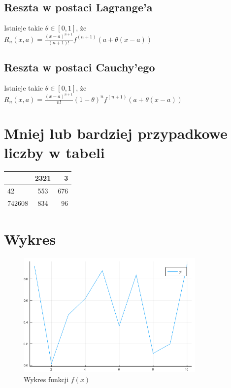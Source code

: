 \documentclass[11pt,wide]{article}
\begin{document}
\subsection{Reszta w postaci Lagrange'a}
Istnieje takie \(\theta\in [0,1]\), że\\
\(\displaystyle R_n(x,a)=\frac{(x-a)^{n+1}}{(n+1)!}f^{(n+1)}(a+\theta(x-a))   \)
\subsection{Reszta w postaci Cauchy'ego}
Istnieje takie \(\theta\in [0,1]\), że\\
\(\displaystyle R_n(x,a)=\frac{(x-a)^{n+1}}{n!} (1-\theta)^n f^{(n+1)}(a+\theta(x-a))   \)

\section{Mniej lub bardziej przypadkowe liczby w tabeli}
\begin{center}
  \begin{tabular}{ | l | c  r | }
    \hline
      & 2321 & 3 \\ \hline
    42 & 553 & 676 \\ 
    742608 & 834 & 96 \\
    \hline
  \end{tabular}
\end{center}

\section{Wykres}
\begin{figure}[h]
	\centering
	\includegraphics[width=0.82\textwidth]{plot}
	\caption{Wykres funkcji \(f(x)\)}
\end{figure}
\end{document}
